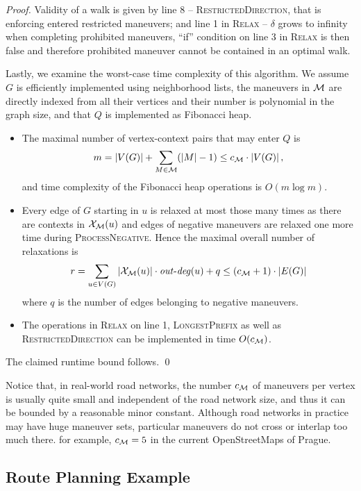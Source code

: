 \documentclass[envcountsect,envcountsame]{llncs}
\begin{document}
\begin{proof}
Validity of a walk is given by line 8 -- \textsc{RestrictedDirection}, that is 
enforcing entered restricted maneuvers; and line 1 in \textsc{Relax} --
$\delta$ grows to infinity when completing prohibited maneuvers, 
``if'' condition on line 3 in \textsc{Relax} is then false and therefore
prohibited maneuver cannot be contained in an optimal walk.

\medskip

Lastly, we examine the worst-case time complexity of this algorithm. We 
assume $G$ is efficiently implemented using neighborhood lists, the maneuvers 
in $\cal M$ are directly indexed from all their vertices and their number is 
polynomial in the graph size, and that $Q$ is implemented as Fibonacci heap.

\begin{itemize}
\item The maximal number of vertex-context pairs that may enter $Q$ is
  $$ m= |V(G)|+\sum_{M\in\cal M}(|M| - 1)\leq c_{\cal{M}} \cdot |V(G)| \,,$$
  and time complexity of the Fibonacci heap operations is $O(m\log m)$.
  \medskip

\item Every edge of $G$ starting in $u$ is relaxed at most those many times as 
  there are contexts in ${\cal X_M}(u)$ and edges of negative maneuvers 
  are relaxed one more time during \textsc{ProcessNegative}. Hence the 
  maximal overall number of  relaxations is
  $$ r= \sum_{u\in V(G)}|{\cal X_M}(u)|\cdot\mathit{out\mbox-deg}(u) + q
  \leq (c_{\cal{M}} + 1) \cdot|E(G)|$$
  where $q$ is the number of edges belonging to negative maneuvers.
  \medskip

\item The operations in \textsc{Relax} on line 1, \textsc{LongestPrefix} 
  as well as \textsc{RestrictedDirection} can be implemented in time 
  $O(c_{\cal{M}})$.
\end{itemize}
The claimed runtime bound follows.
\vskip 0pt
\qed
\medskip 
\end{proof}

Notice that, in real-world road networks, the number $c_{\cal M}$ of maneuvers 
per vertex is usually quite small and independent of the road network size, 
and thus it can be bounded by a reasonable minor constant. Although road 
networks in practice may have huge maneuver sets, particular maneuvers do 
not cross or interlap too much there. for example, $c_{\cal M}=5$ in the current 
OpenStreetMaps of Prague.


\subsection{Route Planning Example}
\label{sec:example}
\end{document}
